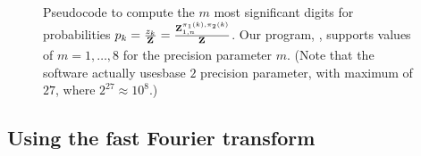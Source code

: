 \begin{figure}[!h]
\begin{small}
\end{small}
\caption{\small
Pseudocode to compute the $m$ most significant digits
for probabilities
$p_k = \frac{z_{k}}{{\bf Z}^{}_{}}=\frac{{\bf Z}^{\pi_1(k),\pi_2(k)}_{1,n}}{{\bf Z}^{}_{}}$.
Our program, \ffttwo, supports values of $m = 1,\dots,8$ for the
precision parameter $m$.
(Note that the software actually usesbase $2$ precision parameter, with maximum of $27$, where $2^{27} \approx
10^8$.)
}
\label{pseudocode:interpolatingP}
\end{figure}


\subsection{Using the fast Fourier transform}
\label{section:FFT}

